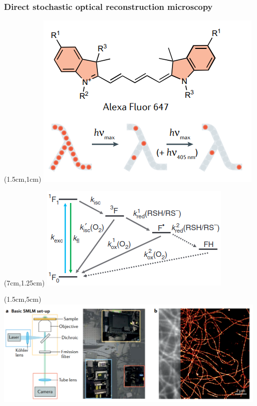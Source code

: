 \documentclass{beamer}					%
\begin{document}
\begin{frame}
\frametitle{Direct stochastic optical reconstruction microscopy}

\begin{textblock*}{5cm}(1.5cm,1cm)
\includegraphics[width=\textwidth]{Fluorophore.png}
\end{textblock*}
  
\begin{textblock*}{6cm}(7cm,1.25cm)
\includegraphics[width=\textwidth]{Photoswitching.png}
\end{textblock*}
  
\begin{textblock*}{12cm}(1.5cm,5cm)
\includegraphics[width=\textwidth]{Setup.png}
\end{textblock*}
  
\end{frame}
\end{document}
